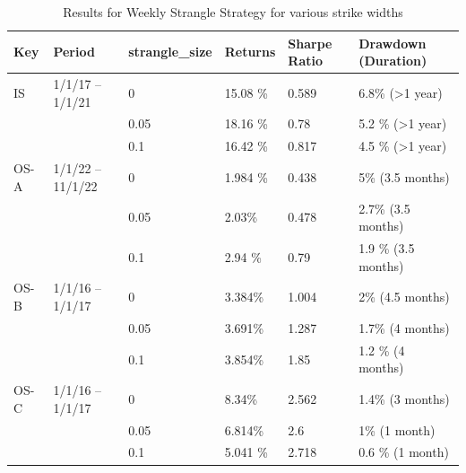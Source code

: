 \documentclass[10pt]{article}
\theoremstyle{definition}
\begin{document}
\begin{table}[t]
\begin{center}
\begin{tabular}{@{}llllll @{}}
\toprule
\textbf{Key} & \textbf{Period} & \textbf{strangle\_size}     & \textbf{Returns} & \textbf{Sharpe Ratio} & \textbf{Drawdown (Duration)} \\ \midrule
 IS & 1/1/17 – 1/1/21  &  0   &   15.08    \%  &     0.589      & 6.8\% (>1 \textrm{year})\\
    &               &        0.05 &  18.16 \% &   0.78    & 5.2 \% (>1 \textrm{year})\\
    &               &        0.1  &  16.42 \% & 0.817 & 4.5 \% (>1 \textrm{year})\\ \midrule
 OS-A & 1/1/22 – 11/1/22 &  0 & 1.984   \%  &  0.438& 5\% (3.5 \textrm{months}) \\
    &               &       0.05& 2.03\%  & 0.478 & 2.7\% (3.5 \textrm{months})\\
    &               &       0.1 & 2.94 \%  & 0.79 & 1.9 \% (3.5 \textrm{months})\\ \midrule 
OS-B & 1/1/16 – 1/1/17  &  0& 3.384\% &  1.004 & 2\% (4.5 \textrm{months})\\ 
    &                   &  0.05& 3.691\% &   1.287 & 1.7\% (4 \textrm{months})\\ 
    &                   &  0.1& 3.854\%& 1.85       & 1.2 \% (4 \textrm{months})\\ \midrule
OS-C & 1/1/16 – 1/1/17  &  0& 8.34\% &  2.562 & 1.4\% (3 \textrm{months})\\ 
    &                   &  0.05& 6.814\% &   2.6 & 1\% (1 \textrm{month})\\ 
    &                   &  0.1& 5.041 \%& 2.718    & 0.6 \% (1 \textrm{month})\\ \midrule
\end{tabular}
\caption{Results for Weekly Strangle Strategy for various strike widths}
\label{ResultsStrangle}
\end{center}
\end{table}
\end{document}
